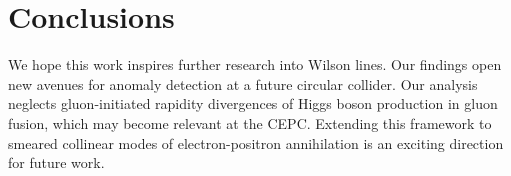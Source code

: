 \section{Conclusions}\label{sec:conclusions}

We hope this work inspires further research into Wilson lines. Our
findings open new avenues for anomaly detection at a future circular
collider. Our analysis neglects gluon-initiated rapidity divergences of
Higgs boson production in gluon fusion, which may become relevant at the
CEPC. Extending this framework to smeared collinear modes of
electron-positron annihilation is an exciting direction for future work.

